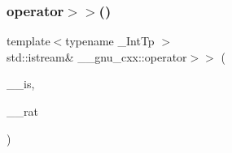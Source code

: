\mbox{\label{namespace____gnu__cxx_a65f7d9a485c3c779aca0f5fb3e807b55}} 
\subsubsection{\texorpdfstring{operator$>$$>$()}{operator>>()}}
{\footnotesize\ttfamily template$<$typename \+\_\+\+Int\+Tp $>$ \\
std\+::istream\& \+\_\+\+\_\+gnu\+\_\+cxx\+::operator$>$$>$ (\begin{DoxyParamCaption}\item[{std\+::istream \&}]{\+\_\+\+\_\+is,  }\item[{\hyperlink{class____gnu__cxx_1_1__Rational}{\+\_\+\+Rational}$<$ \+\_\+\+Int\+Tp $>$ \&}]{\+\_\+\+\_\+rat }\end{DoxyParamCaption})}

